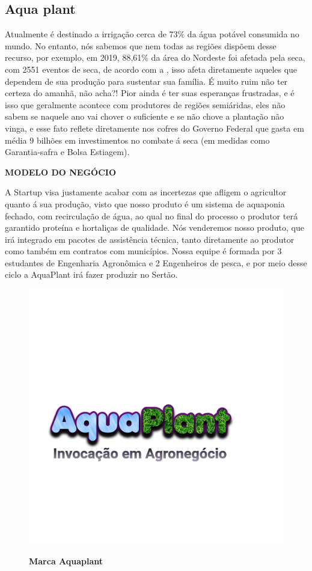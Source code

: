\newpage

\subsection{Aqua plant}


Atualmente é destinado a irrigação cerca de 73\% da água potável consumida no mundo.  No entanto, nós sabemos que nem todas as regiões dispõem desse recurso, por exemplo, em 2019, 88,61\% da área do Nordeste foi afetada pela seca, com 2551 eventos de seca, de acordo com a , isso afeta diretamente aqueles que dependem de sua produção para sustentar sua família. É muito ruim não ter certeza do amanhã, não acha?! Pior ainda é ter suas esperanças frustradas, e é isso  que geralmente acontece com produtores de regiões semiáridas, eles não sabem se naquele ano vai chover o suficiente e se não chove a plantação  não vinga, e esse fato reflete diretamente nos cofres do Governo Federal  que gasta em média 9 bilhões em investimentos no combate á seca (em medidas como Garantia-safra e Bolsa Estiagem).

\textbf{MODELO DO NEGÓCIO}

A Startup visa justamente acabar com as incertezas que  afligem o agricultor quanto á sua produção, visto que nosso produto é um sistema de aquaponia fechado, com recirculação de água, ao qual no final do processo o produtor terá garantido proteína e hortaliças de qualidade. Nós venderemos nosso produto, que irá integrado em pacotes de assistência técnica, tanto diretamente ao produtor como também em contratos com municípios. Nossa equipe é formada por 3 estudantes de Engenharia Agronômica e 2 Engenheiros de pesca, e por meio desse ciclo a AquaPlant irá fazer produzir no Sertão.


\begin{figure}[!htb]
\centering
\caption{\textbf{Marca Aquaplant}}
\includegraphics[scale=0.4]{Imagens/aquaplant.png}
\label{figura_13}
\end{figure}
\newpage

